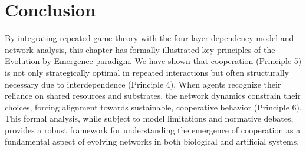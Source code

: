 \section{Conclusion}
By integrating repeated game theory with the four-layer dependency model and network analysis, this chapter has formally illustrated key principles of the Evolution by Emergence paradigm. We have shown that cooperation (Principle 5) is not only strategically optimal in repeated interactions but often structurally necessary due to interdependence (Principle 4). When agents recognize their reliance on shared resources and substrates, the network dynamics constrain their choices, forcing alignment towards sustainable, cooperative behavior (Principle 6). This formal analysis, while subject to model limitations and normative debates, provides a robust framework for understanding the emergence of cooperation as a fundamental aspect of evolving networks in both biological and artificial systems. %
\cleardoublepage
